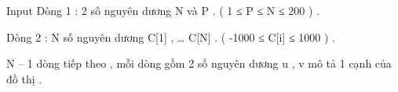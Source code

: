 Input
Dòng 1 : 2 số nguyên dương N và P . ( 1 ≤ P ≤ N ≤ 200 ) .   


   Dòng 2 : N số nguyên dương C[1] , … C[N] . ( -1000 ≤ C[i] ≤ 1000 ) .   


   N – 1 dòng tiếp theo , mỗi dòng gồm 2 số nguyên dương u , v mô tả 1 cạnh của đồ thị .